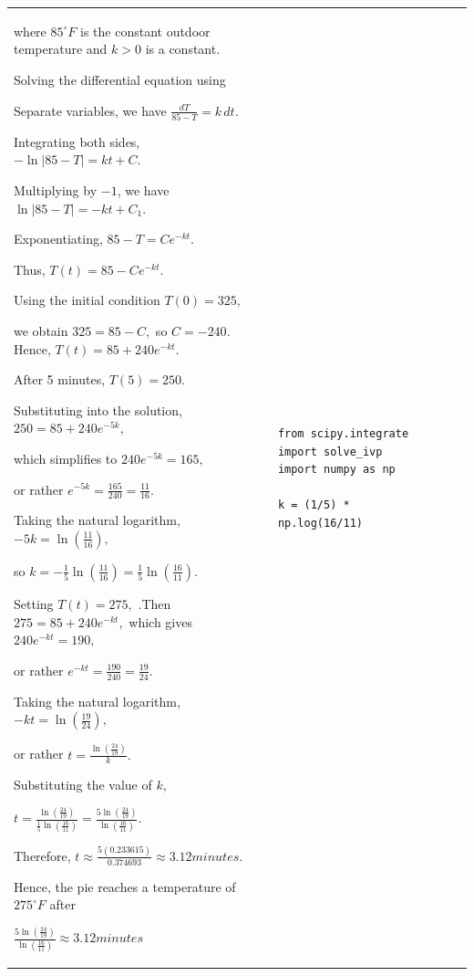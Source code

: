 \documentclass[a4paper,12pt]{article}
\begin{document}
\begin{longtable}{|p{0.3cm}|p{}|p{10cm}|p{}|p{1.5cm}|}
where $85^\circ F$ is the constant outdoor temperature and $k>0$ is a constant.

Solving the differential equation using

Separate variables, we have $ \frac{dT}{85-T}=k\,dt.$

Integrating both sides, $-\ln|85-T|=kt+C.$

Multiplying by $-1$, we have $\ln|85-T|=-kt+C_1.$

Exponentiating, $85-T=Ce^{-kt}.$

Thus, $T(t)=85-Ce^{-kt}.$

Using the initial condition $ T(0)=325,$

we obtain $ 325=85-C,$  so $ C=-240.$
Hence,  $ T(t)=85+240e^{-kt}.$

After 5 minutes, $T(5)=250.$

Substituting into the solution, $250=85+240e^{-5k},$

which simplifies to $ 240e^{-5k}=165,$

or rather $e^{-5k}=\frac{165}{240}=\frac{11}{16}.$

Taking the natural logarithm, $-5k=\ln\left(\frac{11}{16}\right),$

so $ k=-\frac1{5}\ln\left(\frac{11}{16}\right) =\frac1{5}\ln\left(\frac{16}{11}\right).
$

Setting $T(t)=275,$ .Then $ 275=85+240e^{-kt},$  which gives $240e^{-kt}=190,$

or rather $ e^{-kt}=\frac{190}{240}=\frac{19}{24}.$

Taking the natural logarithm, $ -kt=\ln\left(\frac{19}{24}\right),$

or rather $ t=\frac{\ln\left(\frac{24}{19}\right)}{k}.$

Substituting the value of $k$,

$ t=
\frac{\ln\left(\frac{24}{19}\right)}
{\frac1{5}\ln\left(\frac{16}{11}\right)}
=\frac{5\ln\left(\frac{24}{19}\right)}
{\ln\left(\frac{16}{11}\right)}.
$

Therefore, $
t\approx
\frac{5(0.233615)}
{0.374693}
\approx3.12 minutes.
$

Hence, the pie reaches a temperature of $275^\circ F$ after

$
\frac{5\ln\left(\frac{24}{19}\right)}
{\ln\left(\frac{16}{11}\right)}
\approx3.12 minutes
$
                &\begin{verbatim}
from scipy.integrate import solve_ivp
import numpy as np

k = (1/5) * np.log(16/11)


\end{verbatim}
\end{longtable}
\end{document}
